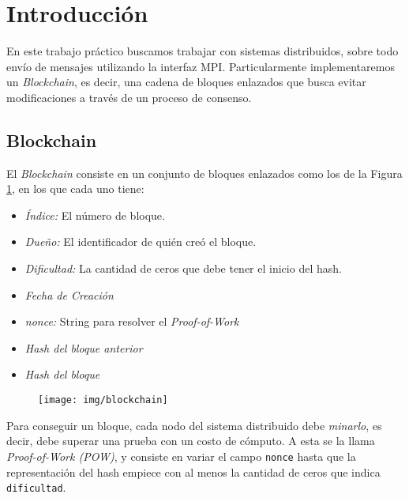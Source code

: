 \section{Introducción}





En este trabajo pr\'actico buscamos trabajar con sistemas distribuidos, sobre todo env\'io de mensajes utilizando la interfaz MPI. Particularmente implementaremos un \textit{Blockchain}, es decir, una cadena de bloques enlazados que busca evitar modificaciones a trav\'es de un proceso de consenso.

\subsection{Blockchain}
El \textit{Blockchain} consiste en un conjunto de bloques enlazados como los de la Figura \ref{fig:blockchain}, en los que cada uno tiene:
\begin{itemize}
	\item \textit{\'Indice:} El n\'umero de bloque.
	\item \textit{Due\~no:} El identificador de qui\'en cre\'o el bloque.
	\item \textit{Dificultad:} La cantidad de ceros que debe tener el inicio del hash.
	\item \textit{Fecha de Creaci\'on}
	\item \textit{nonce:} String para resolver el \textit{Proof-of-Work}
	\item \textit{Hash del bloque anterior}
	\item \textit{Hash del bloque}
\end{itemize}

\begin{figure}
	\centering
	\texttt{[image: img/blockchain]}
	\caption[Representaci\'on gr\'afica de un \textit{Blockchain}.]{}
	\label{fig:blockchain}
\end{figure}


Para conseguir un bloque, cada nodo del sistema distribuido debe \textit{minarlo}, es decir, debe superar una prueba con un costo de c\'omputo. A esta se la llama \textit{Proof-of-Work (POW)}, y consiste en variar el campo \texttt{nonce} hasta que la representaci\'on del hash empiece con al menos la cantidad de ceros que indica \texttt{dificultad}. 

